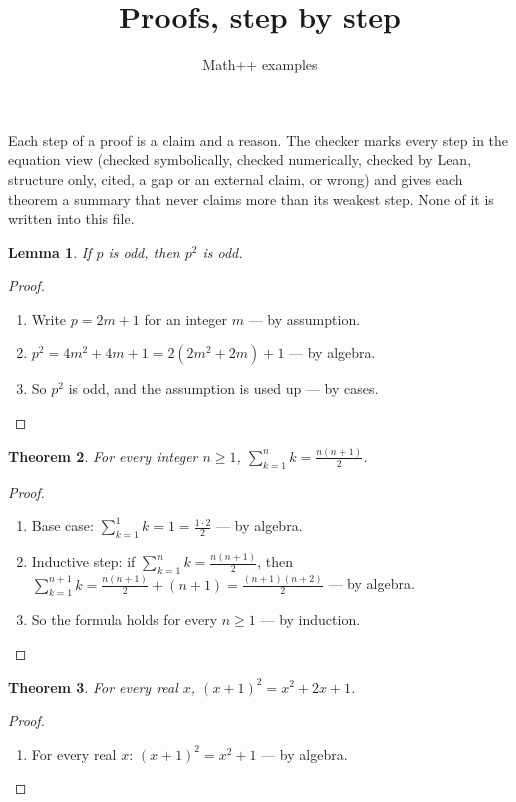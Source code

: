 \documentclass[11pt,a4paper]{article}
\theoremstyle{plain}
\newtheorem{theorem}{Theorem}
\newtheorem{lemma}[theorem]{Lemma}
\theoremstyle{definition}
\theoremstyle{remark}
\begin{document}
\title{Proofs, step by step}
\author{Math++ examples}
\date{}
\maketitle
Each step of a proof is a claim and a reason. The checker marks every step in the equation view (checked symbolically, checked numerically, checked by Lean, structure only, cited, a gap or an external claim, or wrong) and gives each theorem a summary that never claims more than its weakest step. None of it is written into this file.

\begin{lemma}
If $p$ is odd, then $p^2$ is odd.

\end{lemma}
\begin{proof}
\begin{enumerate}
\item Write $p = 2m + 1$ for an integer $m$ --- by assumption.
\item $p^2 = 4m^2 + 4m + 1 = 2(2m^2 + 2m) + 1$ --- by algebra.
\item So $p^2$ is odd, and the assumption is used up --- by cases.
\end{enumerate}
\end{proof}
\begin{theorem}
For every integer $n \ge 1$, $\sum_{k=1}^{n} k = \frac{n(n+1)}{2}$.

\end{theorem}
\begin{proof}
\begin{enumerate}
\item Base case: $\sum_{k=1}^{1} k = 1 = \frac{1 \cdot 2}{2}$ --- by algebra.
\item Inductive step: if $\sum_{k=1}^{n} k = \frac{n(n+1)}{2}$, then $\sum_{k=1}^{n+1} k = \frac{n(n+1)}{2} + (n+1) = \frac{(n+1)(n+2)}{2}$ --- by algebra.
\item So the formula holds for every $n \ge 1$ --- by induction.
\end{enumerate}
\end{proof}
\begin{theorem}
For every real $x$, $(x + 1)^2 = x^2 + 2x + 1$.

\end{theorem}
\begin{proof}
\begin{enumerate}
\item For every real $x$: $(x + 1)^2 = x^2 + 1$ --- by algebra.
\end{enumerate}
\end{proof}
\end{document}
